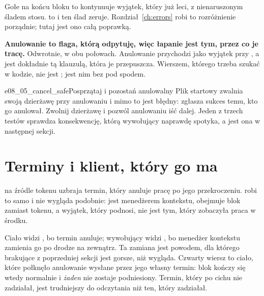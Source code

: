 
\begin{csbox}
Gołe  na końcu bloku  to  \dash{}
kontynuuje wyjątek, który już leci, z nienaruszonym śladem stosu.
 to  i ten ślad zeruje.
Rozdział~\ref{ch:errors} robi to rozróżnienie porządnie; tutaj jest ono
całą poprawką.
\end{csbox}

\begin{trapbox}
\textbf{Anulowanie to flaga, którą odpytuję, więc łapanie
 jest tym, przez co je tracę.} Odwrotnie, w obu połowach.
Anulowanie przychodzi jako wyjątek przy , a
 jest dokładnie tą klauzulą, która je przepuszcza.
Wierszem, którego trzeba szukać w kodzie, nie jest ;
jest nim  bez  pod spodem.
\end{trapbox}

\begin{exercise}{e08_05_cancel_safe}{Posprzątaj i pozostań anulowalny}
Plik startowy zwalnia swoją dzierżawę przy anulowaniu i mimo to jest
błędny: zgłasza sukces temu, kto go anulował. Zwolnij dzierżawę i pozwól
anulowaniu iść dalej. Jeden z trzech testów sprawdza konsekwencję, którą
wywołujący naprawdę spotyka, a jest ona w następnej sekcji.
\end{exercise}

\section{Terminy i klient, który go ma}
\label{sec:asyncio-deadline}

 na źródle tokenu uzbraja termin, który anuluje pracę po
jego przekroczeniu.  robi to samo i nie wygląda
podobnie: jest menedżerem kontekstu, obejmuje blok zamiast tokenu, a
wyjątek, który podnosi, nie jest tym, który zobaczyła praca w środku.



\noindent
Ciało widzi , bo termin anuluje; wywołujący widzi
, bo menedżer kontekstu zamienia go po drodze na
zewnątrz. Ta zamiana jest powodem, dla którego brakujące  z
poprzedniej sekcji jest gorsze, niż wygląda. Czwarty wiersz to ciało, które
połknęło anulowanie wysłane przez jego własny termin: blok kończy się
wtedy normalnie i \emph{żaden}  nie zostaje podniesiony.
Termin, który po cichu nie zadziałał, jest trudniejszy do odczytania niż
ten, który zadziałał.

